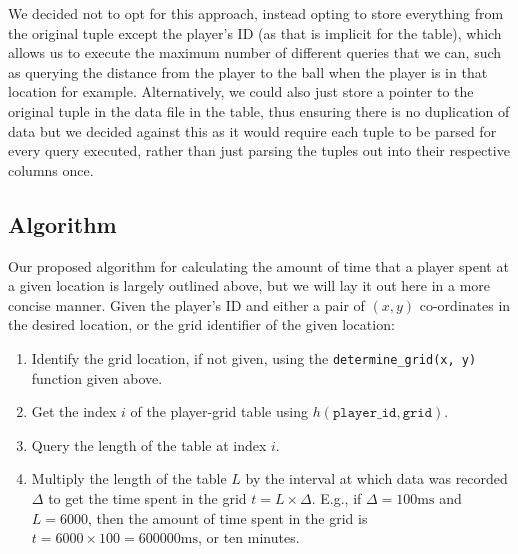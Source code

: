 \documentclass[a4paper,11pt]{article}
\begin{document}
\begin{enumerate}
\begin{enumerate}
                        We decided not to opt for this approach, instead opting to store everything from the original tuple except the player's ID (as that is implicit for the table), which allows us to execute the maximum number of different queries that we can, such as querying the distance from the player to the ball when the player is in that location for example.
                        Alternatively, we could also just store a pointer to the original tuple in the data file in the table, thus ensuring there is no duplication of data but we decided against this as it would require each tuple to be parsed for every query executed, rather than just parsing the tuples out into their respective columns once. 
            \end{enumerate}
\end{enumerate}

\subsection{Algorithm}
Our proposed algorithm for calculating the amount of time that a player spent at a given location is largely outlined above, but we will lay it out here in a more concise manner. 
Given the player's ID and either a pair of $(x,y)$ co-ordinates in the desired location, or the grid identifier of the given location: 
\begin{enumerate}
    \item   Identify the grid location, if not given, using the \texttt{determine_grid(x, y)} function given above.
    \item   Get the index $i$ of the player-grid table using $h(\texttt{player\_id}, \texttt{grid})$.
    \item   Query the length of the table at index $i$.
    \item   Multiply the length of the table $L$ by the interval at which data was recorded $\Delta$ to get the time spent in the grid $t = L \times \Delta$.
            E.g., if $\Delta = 100\text{ms}$ and $L = 6000$, then the amount of time spent in the grid is $t = 6000 \times 100 = 600000\text{ms}$, or ten minutes.
\end{enumerate}
\end{document}
